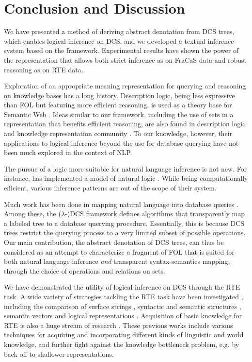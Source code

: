 \documentclass[11pt]{article}
\begin{document}
\section{Conclusion and Discussion}

We have presented a method of deriving abstract denotation from DCS trees, 
which enables logical inference on DCS, and we developed a textual inference
system based on the framework.
Experimental results have shown the power of the representation that allows
both strict inference as on FraCaS data and robust reasoning as on RTE data.

Exploration of an appropriate meaning representation 
for querying and reasoning on knowledge bases has a long history.
Description logic, being less expressive than FOL but featuring more efficient reasoning,
is used as a theory base for Semantic Web \cite{OWL}.
Ideas similar to our framework, including the 
use of sets in a representation that benefits efficient reasoning,
are also found in description logic and knowledge representation community \cite{Baader03,Sowa99,Sukkarieh03}. 
To our knowledge, however, their applications to logical inference beyond
the use for database querying have not been much explored in the context of NLP.

The pursue of a logic more suitable for natural language inference is not new.
For instance,  has implemented a model of natural logic \cite{lakoff70}.
While being computationally efficient, 
various inference patterns are out of the scope of their system.

Much work has been done in mapping natural language into database queries
\cite{cai-yates13,kwiatkowski13,poon13}.
Among these, the ($\lambda$-)DCS \cite{liang11,berant13} framework defines algorithms
that transparently map a labeled tree to a database querying procedure.
Essentially, this is because DCS trees restrict the querying process to
a very limited subset of possible operations. 
Our main contribution, the abstract denotation of DCS trees, can thus be considered as
an attempt to characterize a fragment of FOL that is suited for both natural language 
inference {\it and} transparent syntax-semantics mapping, through the choice of 
operations and relations on sets.

We have demonstrated the utility of logical inference on DCS through the RTE task.
A wide variety of strategies tackling the RTE task have been investigated 
\cite{rtesurvey}, including the 
comparison of surface strings \cite{jijkoun05}, syntactic and semantic structures \cite{haghighi05,snow06,zanzotto09,burchardt09,heilman10,wang10}, 
semantic vectors \cite{erk09} and logical representations \cite{bos05,raina05,tatu05}. 
Acquisition of basic knowledge for RTE is also a huge stream of research \cite{lin01,shinyama02,sudo03,szpektor04,fujita12,weisman12,yan13}.
These previous works include various techniques for acquiring and incorporating different kinds of 
linguistic and world knowledge, 
and further fight against the knowledge bottleneck problem, 
e.g. by back-off to shallower representations.
\end{document}
